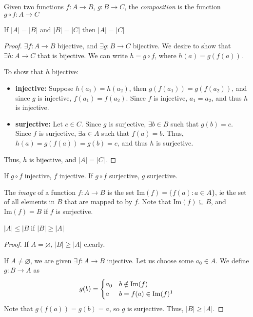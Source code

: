 \documentclass[12pt,oneside]{article}
\begin{document}
\begin{definition}[Composition]
  Given two functions $f: A \to B$, $g: B \to C$, the \emph{composition} is the function $g \circ f : A \to C$
\end{definition}
  
\begin{proposition}
  If $|A| = |B|$ and $|B| = |C|$ then $|A|=|C|$
\end{proposition}

\begin{proof}
  $\exists f: A \to B$ bijective, and $\exists g: B \to C$ bijective. We desire to show that $\exists h : A \to C$ that is bijective. We can write $h = g \circ f$, where $h(a) = g(f(a))$. 

  To show that $h$ bijective:
  \begin{itemize}
    \item \textbf{injective:} Suppose $h(a_1) = h(a_2)$, then $g(f(a_1)) = g(f(a_2))$, and since $g$ is injective, $f(a_1) = f(a_2)$. Since $f$ is injective, $a_1 = a_2$, and thus $h$ is injective.
    \item \textbf{surjective:} Let $c \in C$. Since $g$ is surjective, $\exists b \in B$ such that $g(b) = c$. Since $f$ is surjective, $\exists a \in A$ such that $f(a) = b$. Thus, $h(a) = g(f(a)) = g(b) = c$, and thus $h$ is surjective.
  \end{itemize}
  Thus, $h$ is bijective, and $|A|=|C|$.
\end{proof}

\begin{lemma}
  If $g \circ f$ injective, $f$ injective. If $g \circ f$ surjective, $g$ surjective.
\end{lemma}

\begin{definition}[Image]
  The \emph{image} of a function $f: A \to B$ is the set $\text{Im}(f) = \{f(a) : a \in A\}$, ie the set of all elements in $B$ that are mapped to by $f$. Note that $\text{Im}(f) \subseteq B$, and $\text{Im}(f) = B$ if $f$ is surjective.
\end{definition}

\begin{proposition}
  $|A|\leq |B|$if $ |B| \geq |A|$  
\end{proposition}
  
\begin{proof}
  If $A = \varnothing$, $|B|\geq |A|$ clearly.

  If $A \neq \varnothing$, we are given $\exists f: A \to B$ injective. Let us choose some $a_0 \in A$. We define $g: B \to A$ as \[g(b) = \begin{cases}
    a_0 & b \notin \text{Im}(f)\\
    a & b =f(a)\in \text{Im}(f)\footnotemark
  \end{cases}\] Note that $g(f(a)) = g(b) = a$, so $g$ is surjective. Thus, $|B| \geq |A|$.
\end{proof}
\end{document}
